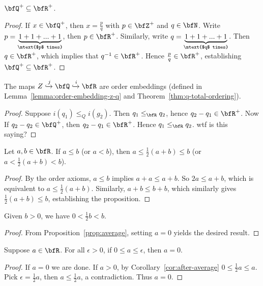     \begin{proposition}
        $\bfQ^+ \subseteq \bfR^+$.
    \end{proposition}
        \begin{proof}
            If $x \in \bfQ^+$, then $x = \frac{p}{q}$ with $p \in \bfZ^+$ and $q \in \bfN$. Write $p = \underbrace{1 + 1 + ... + 1}_{\mtext{$p$ times}}$, then $p \in \bfR^+$. Similarly, write $q = \underbrace{1 + 1 + ... + 1}_{\mtext{$q$ times}}$. Then $q \in \bfR^+$, which implies that $q^{-1} \in \bfR^+$. Hence $\frac{p}{q} \in \bfR^+$, establishing $\bfQ^+ \subseteq \bfR^+$.
        \end{proof}

    \begin{proposition}
        The maps $Z \xhookrightarrow{j} \bfQ \xhookrightarrow{i} \bfR$ are order embeddings (defined in Lemma~\ref{lemma:order-embedding-z-q} and Theorem~\ref{thm:q-total-ordering}).
    \end{proposition}
        \begin{proof}
            Suppose $i(q_1) \leq_Q i(g_2)$. Then $q_1 \leq_\bfR q_2$, hence $q_2 - q_1 \in \bfR^+$. Now If $q_2 - q_2 \in \bfQ^+$, then $q_2 - q_1 \in \bfR^+$. Hence $q_1 \leq_\bfR q_2$. {\color{red} wtf is this saying?}
        \end{proof}

    \begin{proposition}\label{prop:average}
        Let $a,b \in \bfR$. If $a \leq b$ (or $a < b$), then $a \leq \frac{1}{2}(a+b) \leq b$ (or $a < \frac{1}{2}(a+b) < b$).
    \end{proposition}
        \begin{proof}
            By the order axioms, $a \leq b$ implies $a + a \leq a + b$. So $2a \leq a + b$, which is equivalent to $a \leq \frac{1}{2}(a+b)$. Similarly, $a + b \leq b + b$, which similarly gives $\frac{1}{2}(a+b) \leq b$, establishing the proposition.
        \end{proof}

    \begin{corollary}\label{cor:after-average}
        Given $b>0$, we have $0 < \frac{1}{2}b < b$.
    \end{corollary}
        \begin{proof}
            From Proposition~\ref{prop:average}, setting $a = 0$ yields the desired result.
        \end{proof}

    \begin{proposition}
        Suppose $a \in \bfR$. For all $\epsilon > 0$, if $0 \leq a \leq \epsilon$, then $a = 0$.
    \end{proposition}
        \begin{proof}
            If $a = 0$ we are done. If $a > 0$, by Corollary~\ref{cor:after-average} $0 \leq \frac{1}{2}a \leq a$. Pick $\epsilon = \frac{1}{2}a$, then $a \leq \frac{1}{2}a$, a contradiction. Thus $a = 0$.
        \end{proof}


